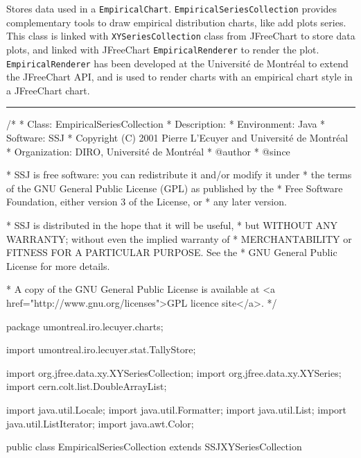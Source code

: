 
Stores data used in a \texttt{EmpiricalChart}. %
\texttt{EmpiricalSeriesCollection} provides complementary tools to draw
empirical distribution charts, like add plots series.
This class is linked with \texttt{XYSeriesCollection} class from JFreeChart
to store data plots, and linked with JFreeChart \texttt{EmpiricalRenderer} to
render the plot. \texttt{EmpiricalRenderer} has been developed at the
Universit\'e de Montr\'eal to extend the JFreeChart API, and is used to render
charts with an empirical chart style in a JFreeChart chart.

\bigskip\hrule
\begin{code}
\begin{hide}
/*
 * Class:        EmpiricalSeriesCollection
 * Description:  
 * Environment:  Java
 * Software:     SSJ 
 * Copyright (C) 2001  Pierre L'Ecuyer and Université de Montréal
 * Organization: DIRO, Université de Montréal
 * @author       
 * @since

 * SSJ is free software: you can redistribute it and/or modify it under
 * the terms of the GNU General Public License (GPL) as published by the
 * Free Software Foundation, either version 3 of the License, or
 * any later version.

 * SSJ is distributed in the hope that it will be useful,
 * but WITHOUT ANY WARRANTY; without even the implied warranty of
 * MERCHANTABILITY or FITNESS FOR A PARTICULAR PURPOSE.  See the
 * GNU General Public License for more details.

 * A copy of the GNU General Public License is available at
   <a href="http://www.gnu.org/licenses">GPL licence site</a>.
 */
\end{hide}
package umontreal.iro.lecuyer.charts;\begin{hide}

import   umontreal.iro.lecuyer.stat.TallyStore;

import   org.jfree.data.xy.XYSeriesCollection;
import   org.jfree.data.xy.XYSeries;
import   cern.colt.list.DoubleArrayList;

import   java.util.Locale;
import   java.util.Formatter;
import   java.util.List;
import   java.util.ListIterator;
import   java.awt.Color;\end{hide}

public class EmpiricalSeriesCollection extends SSJXYSeriesCollection \begin{hide} {

}
\end{hide}
\end{code}
